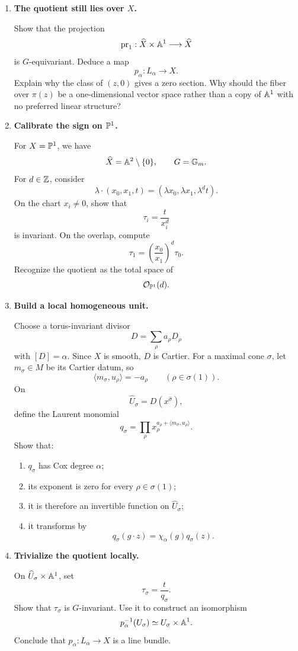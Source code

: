\begin{enumerate}[label=\textbf{Hint \arabic*.},wide=0pt]

\item \textbf{The quotient still lies over \(X\).}

Show that the projection
\[
\operatorname{pr}_1:\widehat X\times\mathbb{A}^1\longrightarrow\widehat X
\]
is \(G\)-equivariant. Deduce a map
\[
p_\alpha:L_\alpha\longrightarrow X.
\]
Explain why the class of \((z,0)\) gives a zero section. Why should the
fiber over \(\pi(z)\) be a one-dimensional vector space rather than a
copy of \(\mathbb{A}^1\) with no preferred linear structure?

\item \textbf{Calibrate the sign on \(\mathbb{P}^1\).}

For \(X=\mathbb{P}^1\), we have
\[
\widehat X=\mathbb{A}^2\setminus\{0\},
\qquad
G=\mathbb{G}_{m}.
\]
For \(d\in\mathbb{Z}\), consider
\[
\lambda\cdot(x_0,x_1,t)
=
(\lambda x_0,\lambda x_1,\lambda^d t).
\]
On the chart \(x_i\neq0\), show that
\[
\tau_i=\frac{t}{x_i^d}
\]
is invariant. On the overlap, compute
\[
\tau_1
=
\left(\frac{x_0}{x_1}\right)^d\tau_0.
\]
Recognize the quotient as the total space of
\[
\mathcal O_{\mathbb{P}^1}(d).
\]

\item \textbf{Build a local homogeneous unit.}

Choose a torus-invariant divisor
\[
D=\sum_\rho a_\rho D_\rho
\]
with \([D]=\alpha\). Since \(X\) is smooth, \(D\) is Cartier. For a
maximal cone \(\sigma\), let \(m_\sigma\in M\) be its Cartier datum,
so
\[
\langle m_\sigma,u_\rho\rangle=-a_\rho
\qquad
(\rho\in\sigma(1)).
\]
On
\[
\widehat U_\sigma=D(x^{\widehat\sigma}),
\]
define the Laurent monomial
\[
q_\sigma
=
\prod_\rho
x_\rho^{a_\rho+\langle m_\sigma,u_\rho\rangle}.
\]
Show that:
\begin{enumerate}[label=(\alph*),wide=0pt]
\item \(q_\sigma\) has Cox degree \(\alpha\);
\item its exponent is zero for every \(\rho\in\sigma(1)\);
\item it is therefore an invertible function on
\(\widehat U_\sigma\);
\item it transforms by
\[
q_\sigma(g\cdot z)=\chi_\alpha(g)q_\sigma(z).
\]
\end{enumerate}

\item \textbf{Trivialize the quotient locally.}

On \(\widehat U_\sigma\times\mathbb{A}^1\), set
\[
\tau_\sigma=\frac{t}{q_\sigma}.
\]
Show that \(\tau_\sigma\) is \(G\)-invariant. Use it to construct an
isomorphism
\[
p_\alpha^{-1}(U_\sigma)
\simeq
U_\sigma\times\mathbb{A}^1.
\]
Conclude that \(p_\alpha:L_\alpha\to X\) is a line bundle.


\end{enumerate}
